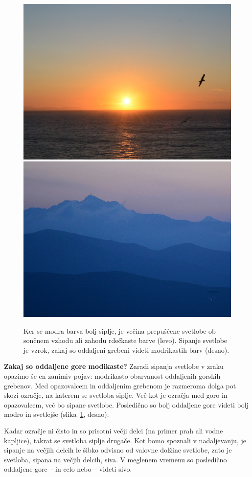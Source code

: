 \begin{figure}[!ht]
\centering
\includegraphics[width=7truecm]{slike/07_Zahod.jpg}\hfill
\includegraphics[width=7truecm]{slike/07_Hribi.jpg}
\caption{Ker se modra barva bolj siplje, je večina prepuščene svetlobe ob sončnem
vzhodu ali zahodu rdečkaste barve (levo). Sipanje svetlobe je vzrok, zakaj so oddaljeni
grebeni videti modrikastih barv (desno).}
\label{fig:07_Rdeca}
\end{figure}

\begin{example}{\bf Zakaj so oddaljene gore modikaste?}
Zaradi sipanja svetlobe v zraku opazimo še en zanimiv pojav: modrikasto
obarvanost oddaljenih gorskih grebenov. Med opazovalcem in oddaljenim grebenom
je razmeroma dolga pot skozi ozračje, na katerem se svetloba siplje. Več kot
je ozračja med goro in opazovalcem, več bo sipane svetlobe. Posledično so
bolj oddaljene gore videti bolj modro in svetlejše (slika~\ref{fig:07_Rdeca}, desno). 

Kadar ozračje ni čisto in so prisotni večji delci (na primer prah ali vodne kapljice),
takrat se svetloba siplje drugače. Kot bomo spoznali v nadaljevanju, je sipanje
na večjih delcih le šibko odvisno od valovne dolžine svetlobe, zato je svetloba, sipana
na večjih delcih, siva. V meglenem vremenu so posledično oddaljene gore -- in celo nebo -- 
videti sivo.
\end{example}

